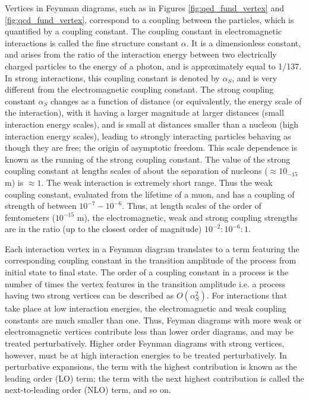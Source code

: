 \documentclass[11pt,a4paper,openright,twoside]{report}
\begin{document}
Vertices in Feynman diagrams, such as in Figures \ref{fig:qed_fund_vertex} and \ref{fig:qcd_fund_vertex}, correspond to a coupling between the particles, which is quantified by a coupling constant. The coupling constant in electromagnetic interactions is called the fine structure constant $\alpha$. It is a dimensionless constant, and arises from the ratio of the interaction energy between two electrically charged particles to the energy of a photon, and is approximately equal to 1/137. In strong interactions, this coupling constant is denoted by $\alpha_{S}$, and is very different from the electromagnetic coupling constant. The strong coupling constant $\alpha_{S}$ changes as a function of distance (or equivalently, the energy scale of the interaction), with it having a larger magnitude at larger distances (small interaction energy scales), and is small at distances smaller than a nucleon (high interaction energy scales), leading to strongly interacting particles behaving as though they are free; the origin of asymptotic freedom. This scale dependence is known as the running of the strong coupling constant. The value of the strong coupling constant at lengths scales of about the separation of nucleons ($\approx 10_{-15}$ m) is $\approx 1$. The weak interaction is extremely short range. Thus the weak coupling constant, evaluated from the lifetime of a muon, and has a coupling of strength of between $10^{-7}-10^{-6}$. Thus, at length scales of the order of femtometers ($10^{-15}$ m), the electromagnetic, weak and strong coupling strengths are in the ratio (up to the closest order of magnitude) $10^{-2}:10^{-6}:1$.

Each interaction vertex in a Feynman diagram translates to a term featuring the corresponding coupling constant in the transition amplitude of the process from initial state to final state. The order of a coupling constant in a process is the number of times the vertex features in the transition amplitude i.e. a process having two strong vertices can be described as $O(\alpha_{S}^2)$. For interactions that take place at low interaction energies, the electromagnetic and weak coupling constants are much smaller than one. Thus, Feyman diagrams with more weak or electromagnetic vertices contribute less than lower order diagrams, and may be treated perturbatively. Higher order Feynman diagrams with strong vertices, however, must be at high interaction energies to be treated perturbatively. In perturbative expansions, the term with the highest contribution is known as the leading order (LO) term; the term with the next highest contribution is called the next-to-leading order (NLO) term, and so on.
\end{document}
